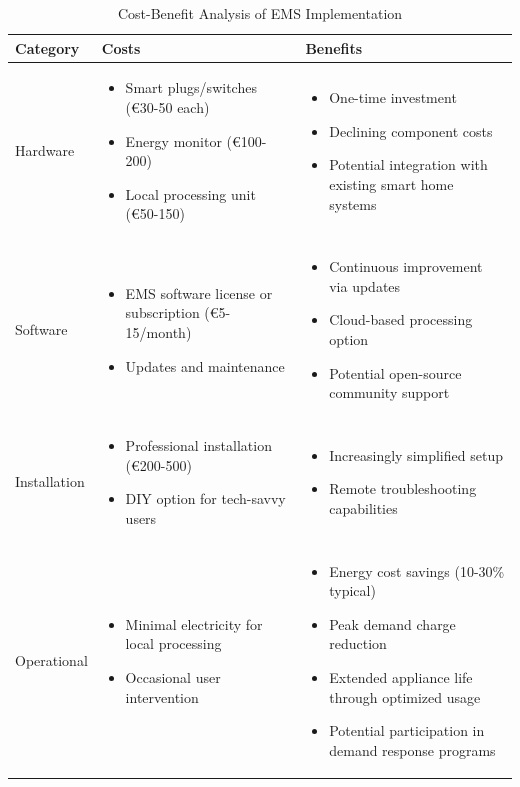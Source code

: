 \documentclass[12pt,a4paper]{article}
\begin{document}
\begin{table}[h]
\centering
\caption{Cost-Benefit Analysis of EMS Implementation}
\label{tab:cost_benefit}
\begin{tabular}{|p{3cm}|p{5cm}|p{5cm}|}
\hline
\textbf{Category} & \textbf{Costs} & \textbf{Benefits} \\ \hline
Hardware & \begin{itemize}\item Smart plugs/switches (€30-50 each)\item Energy monitor (€100-200)\item Local processing unit (€50-150)\end{itemize} & \begin{itemize}\item One-time investment\item Declining component costs\item Potential integration with existing smart home systems\end{itemize} \\ \hline
Software & \begin{itemize}\item EMS software license or subscription (€5-15/month)\item Updates and maintenance\end{itemize} & \begin{itemize}\item Continuous improvement via updates\item Cloud-based processing option\item Potential open-source community support\end{itemize} \\ \hline
Installation & \begin{itemize}\item Professional installation (€200-500)\item DIY option for tech-savvy users\end{itemize} & \begin{itemize}\item Increasingly simplified setup\item Remote troubleshooting capabilities\end{itemize} \\ \hline
Operational & \begin{itemize}\item Minimal electricity for local processing\item Occasional user intervention\end{itemize} & \begin{itemize}\item Energy cost savings (10-30\% typical)\item Peak demand charge reduction\item Extended appliance life through optimized usage\item Potential participation in demand response programs\end{itemize} \\ \hline
\end{tabular}
\end{table}
\end{document}
